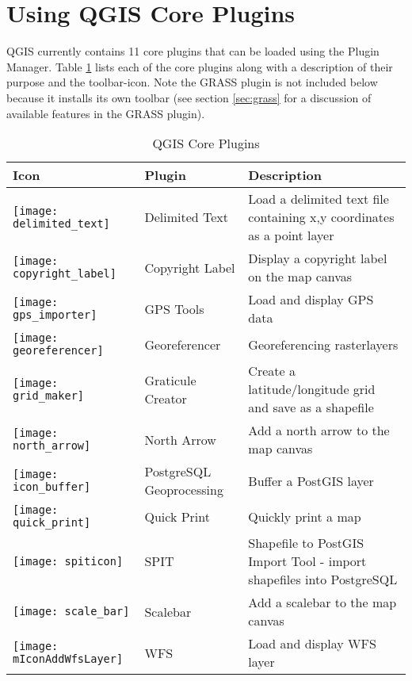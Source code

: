 \section{Using QGIS Core Plugins}\label{sec:core_plugins}

QGIS currently contains 11 core plugins that can be loaded using the Plugin Manager.
Table \ref{tab:core_plugins} lists each of the core plugins along with a description of their purpose and the toolbar-icon.
Note the GRASS plugin is not included below because it installs its own toolbar (see section \ref{sec:grass} for a discussion of available features in the GRASS plugin).

\begin{minipage}{\textwidth}
\begin{table}[H]
\centering
\caption{QGIS Core Plugins}\label{tab:core_plugins}\medskip
\small
 \begin{tabular}{|l|l|p{4in}|}
\hline \textbf{Icon} & \textbf{Plugin} & \textbf{Description} \\
\hline 
\texttt{[image: delimited\_text]}
 & Delimited Text \index{plugins!delimited text}& Load a delimited text file containing x,y coordinates as a point layer \\
\hline 
\texttt{[image: copyright\_label]}
 & Copyright Label \index{plugins!copyright}& Display a copyright label on the map canvas\\
\hline 
\texttt{[image: gps\_importer]}
 & GPS Tools \index{plugins!gps}& Load and display GPS data \\
\hline
\texttt{[image: georeferencer]}
 & Georeferencer \index{plugin!georeferencer} & Georeferencing rasterlayers \\
\hline
\texttt{[image: grid\_maker]}
 & Graticule Creator \index{plugins!graticule}& Create a latitude/longitude grid and save as a shapefile\\
\hline
\texttt{[image: north\_arrow]}
& North Arrow \index{plugins!north arrow}& Add a north arrow to the map canvas\\
\hline
\texttt{[image: icon\_buffer]}
 & PostgreSQL Geoprocessing \index{plugins!geoprocessing}& Buffer a PostGIS layer \\
\hline
\texttt{[image: quick\_print]}
 & Quick Print \index{plugins!quickprint}& Quickly print a map \\
\hline
\texttt{[image: spiticon]}
 & SPIT \index{plugins!spit}& Shapefile to PostGIS Import Tool - import shapefiles into PostgreSQL\\
\hline
\texttt{[image: scale\_bar]}
 & Scalebar \index{plugins!scalebar}& Add a scalebar to the map canvas\\
\hline 
\texttt{[image: mIconAddWfsLayer]}
 & WFS & Load and display WFS layer \\
\hline
\end{tabular}
\end{table}
\end{minipage}

